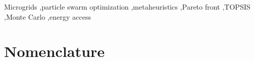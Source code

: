 \documentclass[final,3p,times]{elsarticle}
\begin{document}
\begin{frontmatter}
\begin{keyword}



Microgrids \sep particle swarm optimization \sep metaheuristics \sep Pareto front \sep TOPSIS \sep Monte Carlo \sep energy access

\end{keyword}

\end{frontmatter}

\section*{Nomenclature}
\end{document}
